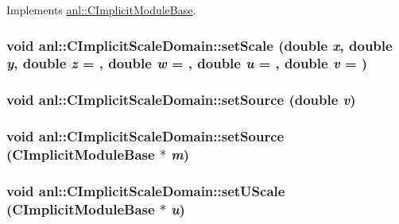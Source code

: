 Implements \hyperlink{classanl_1_1CImplicitModuleBase_ab88f8a1822dcfbc13ba5230318b0acd1}{anl::CImplicitModuleBase}.\hypertarget{classanl_1_1CImplicitScaleDomain_ab957f69850416981a627ee621b8a5e60}{
\subsubsection[{setScale}]{\setlength{\rightskip}{0pt plus 5cm}void anl::CImplicitScaleDomain::setScale (double {\em x}, \/  double {\em y}, \/  double {\em z} = {}, \/  double {\em w} = {}, \/  double {\em u} = {}, \/  double {\em v} = {})}}
\label{classanl_1_1CImplicitScaleDomain_ab957f69850416981a627ee621b8a5e60}
\hypertarget{classanl_1_1CImplicitScaleDomain_ab0a073259bf5cda4c1601f632ca14432}{
\subsubsection[{setSource}]{\setlength{\rightskip}{0pt plus 5cm}void anl::CImplicitScaleDomain::setSource (double {\em v})}}
\label{classanl_1_1CImplicitScaleDomain_ab0a073259bf5cda4c1601f632ca14432}
\hypertarget{classanl_1_1CImplicitScaleDomain_a2117d954811a30ab92838efa4b90c4f6}{
\subsubsection[{setSource}]{\setlength{\rightskip}{0pt plus 5cm}void anl::CImplicitScaleDomain::setSource ({\bf CImplicitModuleBase} $\ast$ {\em m})}}
\label{classanl_1_1CImplicitScaleDomain_a2117d954811a30ab92838efa4b90c4f6}
\hypertarget{classanl_1_1CImplicitScaleDomain_abeaa506433802ff1d131364f310a3037}{
\subsubsection[{setUScale}]{\setlength{\rightskip}{0pt plus 5cm}void anl::CImplicitScaleDomain::setUScale ({\bf CImplicitModuleBase} $\ast$ {\em u})}}
